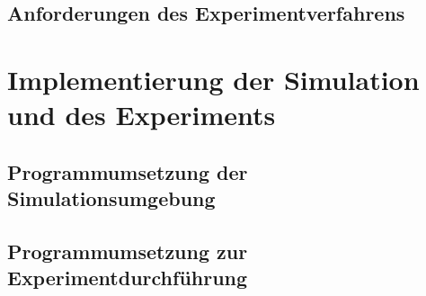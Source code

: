 \subsection{Anforderungen des Experimentverfahrens}

\section{Implementierung der Simulation und des Experiments}
\subsection{Programmumsetzung der Simulationsumgebung}
\subsection{Programmumsetzung zur Experimentdurchführung}